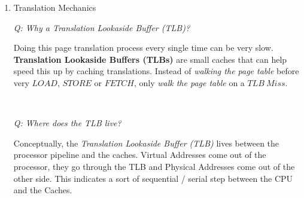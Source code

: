 \documentclass[12pt]{article}
\newenvironment{QandA}{\begin{enumerate}[label=\bfseries\arabic*.]\bfseries}
                      {\end{enumerate}}
\newenvironment{answered}{\par\quad\normalfont}{}
\begin{document}
\begin{QandA}
\begin{answered}
\newpage 

\textit{Address Translation Example: How big is the page table on a machine that is a 32-bit machine with 4B page table entries (PTEs) and has 4KB pages}.

\quad Since it is a 32-bit machine, it has 32-bit Virtual Addresses that is equivalent to $2^{32}B=4GB$ of virtual memory. 

$\text{Number of virtual pages}\ =\ \frac{\text{Virtual Memory}}{\text{Page Size}}\ =\ \frac{4GB}{4KB}\ =\ 1\ Million\ VPs$

Since there are 1 Million VPs which are 4 Bytes each this is 4MB. This is then given to every process! 

\begin{itemize}
    \item If you increase the size of the pages, the size of the table will \textit{reduce}. Say you move from 4KB pages to 64KB pages.
    \item If you move to a 64-bit machine, this increases drastically. $2^{64}B=19\ Exabytes$. This is \textbf{too large}.
\end{itemize}

One solution is to use \textit{Multi-Level Page Tables (PT)}. Virtual Page numbers are split into two halves which map to different intermediate tables. The first half indexes one table, whose value is the index to the next table, essentially providing two levels of \textit{indirection}. This can be generalized to many levels. This results in a \textit{sparse} amount of memory since a \textit{large amount of virtual addresses} are \textbf{unused}. 
\end{answered}

\ 

\item Translation Mechanics
\begin{answered}

\textit{Q: Why a Translation Lookaside Buffer (TLB)?}

Doing this page translation process every single time can be very slow. \textbf{Translation Lookaside Buffers (TLBs)} are small caches that can help speed this up by caching translations. Instead of \textit{walking the page table} before very $LOAD$, $STORE$ or $FETCH$, only \textit{walk the page table} on a $TLB\ Miss$.

\ 

\textit{Q: Where does the TLB live?}

Conceptually, the \textit{Translation Lookaside Buffer (TLB)} lives between the processor pipeline and the caches. Virtual Addresses come out of the processor, they go through the TLB and Physical Addresses come out of the other side. This indicates a sort of sequential / serial step between the CPU and the Caches. 


\end{answered}
\end{QandA}
\end{document}
